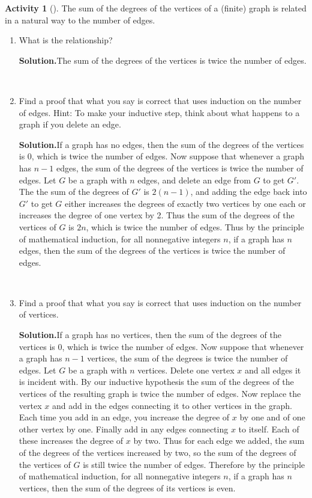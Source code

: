 \documentclass[10pt,]{book}
\theoremstyle{plain}
\theoremstyle{definition}
\newtheorem{activity}[project]{Activity}
\numberwithin{equation}{chapter}
\begin{document}
\begin{activity}[]\label{activity-94}
The sum of the degrees of the vertices of a (finite) graph is related in a natural way to the number of edges.%
~\par
\begin{enumerate}[label=(\alph*)]
 \item What is the relationship?%
\par\medskip\noindent%
\textbf{Solution.}\quad The sum of the degrees of the vertices is twice the number of edges.%

~\par
\item Find a proof that what you say is correct that uses induction on the number of edges.  Hint:  To make your inductive step, think about what happens to a graph if you delete an edge.%
\par\medskip\noindent%
\textbf{Solution.}\quad If a graph has no edges, then the sum of the degrees of the vertices is 0, which is twice the number of edges. Now suppose that whenever a graph has \(n-1\) edges, the sum of the degrees of the vertices is twice the number of edges. Let \(G\) be a graph with \(n\) edges, and delete an edge from \(G\) to get \(G'\). The the sum of the degrees of \(G'\) is \(2(n-1)\), and adding the edge back into \(G'\) to get \(G\) either increases the degrees of exactly two vertices by one each or increases the degree of one vertex by 2. Thus the sum of the degrees of the vertices of \(G\) is \(2n\), which is twice the number of edges. Thus by the principle of mathematical induction, for all nonnegative integers \(n\), if a graph has \(n\) edges, then the sum of the degrees of the vertices is twice the number of edges.%

~\par
\item Find a proof that what you say is correct that uses induction on the number of vertices.%
\par\medskip\noindent%
\textbf{Solution.}\quad If a graph has no vertices, then the sum of the degrees of the vertices is 0, which is twice the number of edges. Now suppose that whenever a graph has \(n-1\) vertices, the sum of the degrees is twice the number of edges. Let \(G\) be a graph with \(n\) vertices. Delete one vertex \(x\) and all edges it is incident with. By our inductive hypothesis the sum of the degrees of the vertices of the resulting graph is twice the number of edges. Now replace the vertex \(x\) and add in the edges connecting it to other vertices in the graph. Each time you add in an edge, you increase the degree of \(x\) by one and of one other vertex by one. Finally add in any edges connecting \(x\) to itself. Each of these increases the degree of \(x\) by two. Thus for each edge we added, the sum of the degrees of the vertices increased by two, so the sum of the degrees of the vertices of \(G\) is still twice the number of edges. Therefore by the principle of mathematical induction, for all nonnegative integers \(n\), if a graph has \(n\) vertices, then the sum of the degrees of its vertices is even.%


\end{enumerate}
\end{activity}
\end{document}
